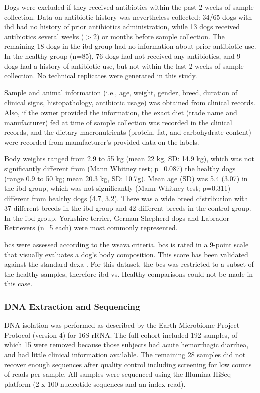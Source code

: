 Dogs were excluded if they received antibiotics within the past 2 weeks of sample collection. Data on antibiotic history was nevertheless collected: 34/65 dogs with \gls{ibd} had no history of prior antibiotics administration, while 13 dogs received antibiotics several weeks ($>$2) or months before sample collection. The remaining 18 dogs in the \gls{ibd} group had no information about prior antibiotic use. In the healthy group (n=85), 76 dogs had not received any antibiotics, and 9 dogs had a history of antibiotic use, but not within the last 2 weeks of sample collection. No technical replicates were generated in this study.

Sample and animal information (i.e., age, weight, gender, breed, duration of clinical signs, histopathology, antibiotic usage) was obtained from clinical records. Also, if the owner provided the information, the exact diet (trade name and manufacturer) fed at time of sample collection was recorded in the clinical records, and the dietary macronutrients (protein, fat, and carbohydrate content) were recorded from manufacturer's provided data on the labels.

Body weights ranged from 2.9 to 55 kg (mean 22 kg, SD: 14.9 kg), which was not significantly different from (Mann Whitney test; p=0.087) the healthy dogs (range 0.9 to 50 kg; mean 20.3 kg, SD: 10.7g). Mean age (SD) was 5.4 (3.07) in the \gls{ibd} group, which was not significantly (Mann Whitney test; p=0.311) different from healthy dogs (4.7, 3.2). There was a wide breed distribution with 37 different breeds in the \gls{ibd} group and 42 different breeds in the control group. In the \gls{ibd} group, Yorkshire terrier, German Shepherd dogs and Labrador Retrievers (n=5 each) were most commonly represented.

\Gls{bcs} were assessed according to the \gls{wsava} criteria. \Gls{bcs} is rated in a 9-point scale that visually evaluates a dog's body composition. This score has been validated against the standard \gls{dexa} \cite{RN4000}. For this dataset, the \Gls{bcs} was restricted to a subset of the healthy samples, therefore \gls{ibd} vs. Healthy comparisons could not be made in this case.

\subsubsection{DNA Extraction and Sequencing}

DNA isolation was performed as described by the Earth Microbiome Project Protocol (version 4) for 16S rRNA\cite{RN164}. The full cohort included 192 samples, of which 15 were removed because those subjects had acute hemorrhagic diarrhea, and had little clinical information available. The remaining 28 samples did not recover enough sequences after quality control including screening for low counts of reads per sample. All samples were sequenced using the Illumina HiSeq platform (2 x 100 nucleotide sequences and an index read).

